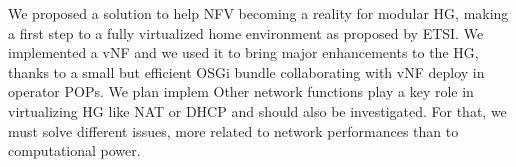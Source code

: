 We proposed a solution to help NFV becoming a reality for modular HG, making a first step to a fully virtualized home environment as proposed by ETSI.
We implemented a vNF and we used it to bring major enhancements to the HG, thanks to a small but efficient OSGi bundle collaborating with vNF deploy in operator POPs.
We plan implem
Other network functions play a key role in virtualizing HG like NAT or DHCP and should also be investigated.
For that, we must solve different issues, more related to network performances than to computational power. 
